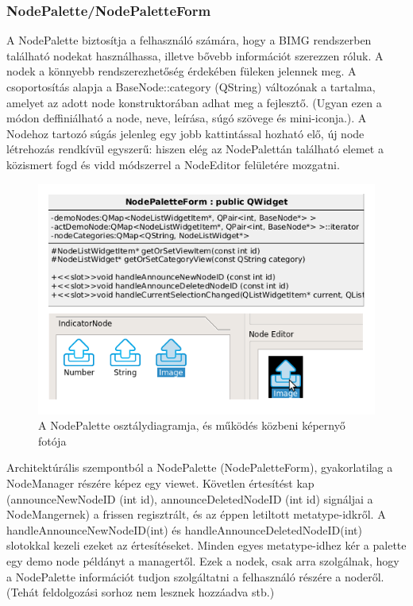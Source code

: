 \documentclass[a4paper,12pt,oneside]{report}
\begin{document}
\subsubsection{NodePalette/NodePaletteForm}
A NodePalette biztosítja a felhasználó számára, hogy a BIMG rendszerben található nodekat használhassa, illetve bővebb információt szerezzen róluk. A nodek a könnyebb rendszerezhetőség érdekében füleken jelennek meg. A csoportosítás alapja a BaseNode::category (QString) változónak a tartalma, amelyet az adott node konstruktorában adhat meg a fejlesztő. (Ugyan ezen a módon deffiniálható a node, neve, leírása, súgó szövege és mini-iconja.). A Nodehoz tartozó súgás jelenleg egy jobb kattintással hozható elő, új node létrehozás rendkívül egyszerű: hiszen elég az NodePalettán található elemet a közismert fogd és vidd módszerrel a NodeEditor felületére mozgatni.
\begin{center}
\begin{figure}[h]
  \includegraphics[width=1\textwidth]{nodepalette.png}
  \caption{A NodePalette osztálydiagramja, és működés közbeni képernyő fotója }

  \label{fig:bimg_nodepalette}
\end{figure}
\end{center}

Architektúrális szempontból a NodePalette (NodePaletteForm), gyakorlatilag a NodeManager részére képez egy viewet. Követlen értesítést kap (announceNewNodeID (int id), announceDeletedNodeID (int id) signáljai a NodeMangernek) a frissen regisztrált, és az éppen letiltott metatype-idkről. A handleAnnounceNewNodeID(int) és handleAnnounceDeletedNodeID(int) slotokkal kezeli ezeket az értesítéseket. Minden egyes metatype-idhez kér a palette egy demo node példányt a managertől. Ezek a nodek, csak arra szolgálnak, hogy a NodePalette információt tudjon szolgáltatni a felhasználó részére a noderől. (Tehát feldolgozási sorhoz nem lesznek hozzáadva stb.)
\end{document}

